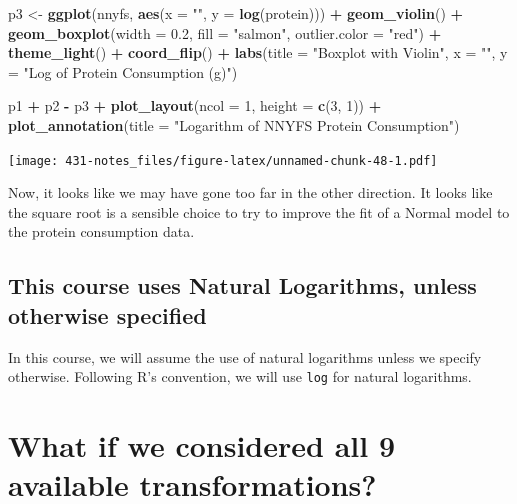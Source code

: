 \documentclass[
]{book}
\newenvironment{Shaded}{\begin{snugshade}}{\end{snugshade}}
\newcommand{\DataTypeTok}[1]{\textcolor[rgb]{0.13,0.29,0.53}{#1}}
\newcommand{\DecValTok}[1]{\textcolor[rgb]{0.00,0.00,0.81}{#1}}
\newcommand{\FloatTok}[1]{\textcolor[rgb]{0.00,0.00,0.81}{#1}}
\newcommand{\KeywordTok}[1]{\textcolor[rgb]{0.13,0.29,0.53}{\textbf{#1}}}
\newcommand{\NormalTok}[1]{#1}
\newcommand{\OperatorTok}[1]{\textcolor[rgb]{0.81,0.36,0.00}{\textbf{#1}}}
\newcommand{\StringTok}[1]{\textcolor[rgb]{0.31,0.60,0.02}{#1}}
\begin{document}
\begin{Shaded}
\begin{Highlighting}[]
\NormalTok{p3 <-}\StringTok{ }\KeywordTok{ggplot}\NormalTok{(nnyfs, }\KeywordTok{aes}\NormalTok{(}\DataTypeTok{x =} \StringTok{""}\NormalTok{, }\DataTypeTok{y =} \KeywordTok{log}\NormalTok{(protein))) }\OperatorTok{+}
\StringTok{    }\KeywordTok{geom_violin}\NormalTok{() }\OperatorTok{+}
\StringTok{    }\KeywordTok{geom_boxplot}\NormalTok{(}\DataTypeTok{width =} \FloatTok{0.2}\NormalTok{, }\DataTypeTok{fill =} \StringTok{"salmon"}\NormalTok{, }
                 \DataTypeTok{outlier.color =} \StringTok{"red"}\NormalTok{) }\OperatorTok{+}
\StringTok{    }\KeywordTok{theme_light}\NormalTok{() }\OperatorTok{+}
\StringTok{    }\KeywordTok{coord_flip}\NormalTok{() }\OperatorTok{+}
\StringTok{    }\KeywordTok{labs}\NormalTok{(}\DataTypeTok{title =} \StringTok{"Boxplot with Violin"}\NormalTok{,}
         \DataTypeTok{x =} \StringTok{""}\NormalTok{, }\DataTypeTok{y =} \StringTok{"Log of Protein Consumption (g)"}\NormalTok{)}

\NormalTok{p1 }\OperatorTok{+}\StringTok{ }\NormalTok{p2 }\OperatorTok{-}\StringTok{ }\NormalTok{p3 }\OperatorTok{+}\StringTok{ }\KeywordTok{plot_layout}\NormalTok{(}\DataTypeTok{ncol =} \DecValTok{1}\NormalTok{, }\DataTypeTok{height =} \KeywordTok{c}\NormalTok{(}\DecValTok{3}\NormalTok{, }\DecValTok{1}\NormalTok{)) }\OperatorTok{+}
\StringTok{    }\KeywordTok{plot_annotation}\NormalTok{(}\DataTypeTok{title =} \StringTok{"Logarithm of NNYFS Protein Consumption"}\NormalTok{)}
\end{Highlighting}
\end{Shaded}

\texttt{[image: 431-notes\_files/figure-latex/unnamed-chunk-48-1.pdf]}

Now, it looks like we may have gone too far in the other direction. It looks like the square root is a sensible choice to try to improve the fit of a Normal model to the protein consumption data.

\hypertarget{this-course-uses-natural-logarithms-unless-otherwise-specified}{%
\subsection{This course uses Natural Logarithms, unless otherwise specified}\label{this-course-uses-natural-logarithms-unless-otherwise-specified}}

In this course, we will assume the use of natural logarithms unless we specify otherwise. Following R's convention, we will use \texttt{log} for natural logarithms.

\hypertarget{what-if-we-considered-all-9-available-transformations}{%
\section{What if we considered all 9 available transformations?}\label{what-if-we-considered-all-9-available-transformations}}
\end{document}
